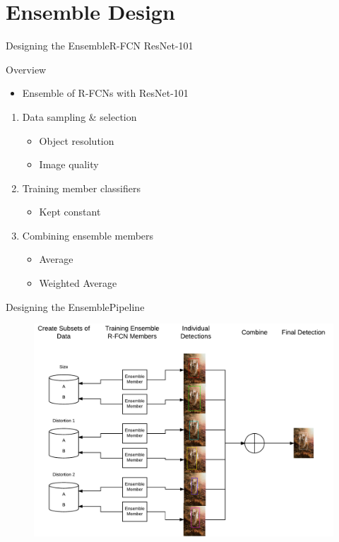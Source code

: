 \section{Ensemble Design}
\begin{frame}{Designing the Ensemble}{R-FCN ResNet-101}
    \begin{block}{Overview}
    \begin{itemize}
        \item Ensemble of R-FCNs with ResNet-101
    \end{itemize}
    \begin{enumerate}
        \item Data sampling \& selection
        \begin{itemize}
            \item Object resolution
            \item Image quality
        \end{itemize}
        \item Training member classifiers
        \begin{itemize}
            \item Kept constant
        \end{itemize}
        \item Combining ensemble members
        \begin{itemize}
            \item Average
            \item Weighted Average
        \end{itemize}       
    \end{enumerate}
\end{block}
\end{frame}

\begin{frame}{Designing the Ensemble}{Pipeline}
    \begin{figure}
        \includegraphics[width=0.8 \textwidth]{figs/ensembledesign.pdf}
    \end{figure}
\end{frame}

